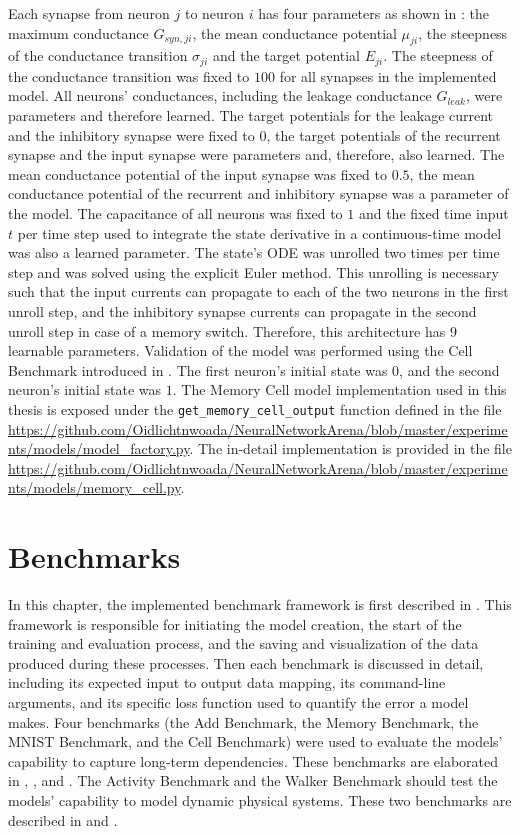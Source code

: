 \documentclass[draft,final]{vutinfth} %
\begin{document}
    Each synapse from neuron $j$ to neuron $i$ has four parameters as shown in : the maximum conductance $G_{syn,ji}$, the mean conductance potential $\mu_{ji}$, the steepness of the conductance transition $\sigma_{ji}$ and the target potential $E_{ji}$.
    The steepness of the conductance transition was fixed to $100$ for all synapses in the implemented model.
    All neurons' conductances, including the leakage conductance $G_{leak}$, were parameters and therefore learned.
    The target potentials for the leakage current and the inhibitory synapse were fixed to $0$, the target potentials of the recurrent synapse and the input synapse were parameters and, therefore, also learned.
    The mean conductance potential of the input synapse was fixed to $0.5$, the mean conductance potential of the recurrent and inhibitory synapse was a parameter of the model.
    The capacitance of all neurons was fixed to $1$ and the fixed time input $t$ per time step used to integrate the state derivative in a continuous-time model was also a learned parameter.
    The state's ODE was unrolled two times per time step and was solved using the explicit Euler method.
    This unrolling is necessary such that the input currents can propagate to each of the two neurons in the first unroll step, and the inhibitory synapse currents can propagate in the second unroll step in case of a memory switch.
    Therefore, this architecture has $9$ learnable parameters.
    Validation of the model was performed using the Cell Benchmark introduced in .
    The first neuron's initial state was $0$, and the second neuron's initial state was $1$.
    The Memory Cell model implementation used in this thesis is exposed under the \texttt{get\_memory\_cell\_output} function defined in the file \url{https://github.com/Oidlichtnwoada/NeuralNetworkArena/blob/master/experiments/models/model_factory.py}.
    The in-detail implementation is provided in the file \url{https://github.com/Oidlichtnwoada/NeuralNetworkArena/blob/master/experiments/models/memory_cell.py}.


    \chapter{Benchmarks}
    In this chapter, the implemented benchmark framework is first described in .
    This framework is responsible for initiating the model creation, the start of the training and evaluation process, and the saving and visualization of the data produced during these processes.
    Then each benchmark is discussed in detail, including its expected input to output data mapping, its command-line arguments, and its specific loss function used to quantify the error a model makes.
    Four benchmarks (the Add Benchmark, the Memory Benchmark, the MNIST Benchmark, and the Cell Benchmark) were used to evaluate the models' capability to capture long-term dependencies.
    These benchmarks are elaborated in , ,  and .
    The Activity Benchmark and the Walker Benchmark should test the models' capability to model dynamic physical systems.
    These two benchmarks are described in  and .
\end{document}
